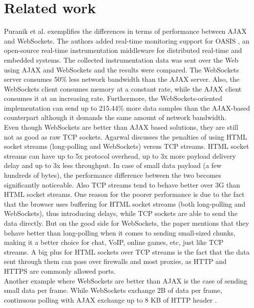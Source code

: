 \documentclass[conference]{IEEEtran}
\begin{document}
\section{Related work}
Puranik et al. \cite{RT-Monitoring} exemplifies the differences in terms of
performance between AJAX and WebSockets. The authors added real-time monitoring
support for OASIS \cite{OASIS}, an open-source real-time instrumentation
middleware for distributed real-time and embedded systems. The collected
instrumentation data was sent over the Web using AJAX and WebSockets and the
results were compared. The WebSockets server consumes 50\% less network
bandwidth than the AJAX server. Also, the WebSockets client consumes memory at
a constant rate, while the AJAX client consumes it at an increasing rate.
Furthermore, the WebSockets-oriented implementation can send up to 215.44\%
more data samples than the AJAX-based counterpart although it demands the same
amount of network bandwidth.
\\

Even though WebSockets are better than AJAX based solutions, they are still
not as good as raw TCP sockets. Agarwal \cite{Performance-Penalty} discusses
the penalties of using HTML socket streams (long-polling and WebSockets) versus
TCP streams. HTML socket streams can have up to 5x protocol overhead, up to
3x more payload delivery delay and up to 3x less throughput. In case of small
data payload (a few hundreds of bytes), the performance difference between the
two becomes significantly noticeable. Also TCP streams tend to behave better
over 3G than HTML socket streams.
One reason for the poorer performance is due to the fact that the browser uses
buffering for HTML socket streams (both long-polling and WebSockets), thus 
introducing delays, while TCP sockets are able to send the data directly.
But on the good side for
WebSockets, the paper mentions that they behave better than long-polling when
it comes to sending small-sized chunks, making it a better choice for chat,
VoIP, online games, etc, just like TCP streams. A big plus for HTML sockets
over TCP streams is the fact that the data sent through them can pass over
firewalls and most proxies, as HTTP and HTTPS are commonly allowed ports.
\\

Another example where WebSockets are better than AJAX is the case of sending
small data per frame. While WebSockets exchange 2B of data per frame, continuous
polling with AJAX exchange up to 8 KB of HTTP header \cite{2009:Misc}.
\\
\end{document}
